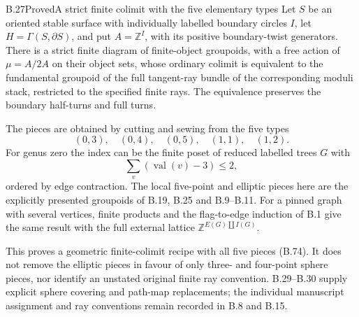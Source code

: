 \begin{result}{B.27}{Proved}{A strict finite colimit with the five elementary types}
Let $S$ be an oriented stable surface with individually labelled
boundary circles $I$, let $H=\Gamma(S,\partial S)$, and put
$A=\mathbb Z^I$, with its positive boundary-twist generators.
There is a strict finite diagram of finite-object groupoids,
with a free action of $\mu=A/2A$ on their object sets, whose
ordinary colimit is equivalent to the fundamental groupoid of
the full tangent-ray bundle of the corresponding moduli stack,
restricted to the specified finite rays.  The equivalence
preserves the boundary half-turns and full turns.

The pieces are obtained by cutting and sewing from the five
types
\[
 (0,3),\quad(0,4),\quad(0,5),\quad(1,1),\quad(1,2). \tag{B.74}
\]
For genus zero the index can be the finite poset of reduced
labelled trees $G$ with
\[
 \sum_v(\operatorname{val}(v)-3)\leq2,
\]
ordered by edge contraction.  The local five-point and elliptic
pieces here are the explicitly presented groupoids of B.19,
B.25 and B.9--B.11.  For a pinned graph with several vertices,
finite products and the flag-to-edge induction of B.1 give the
same result with the full external lattice
$\mathbb Z^{E(G)\amalg I(G)}$.

This proves a geometric finite-colimit recipe with all five
pieces (B.74).  It does not remove the elliptic pieces in favour
of only three- and four-point sphere pieces, nor identify an
unstated original finite ray convention.  B.29--B.30 supply explicit
sphere covering and path-map replacements; the individual manuscript
assignment and ray conventions remain recorded in B.8 and B.15.
\end{result}
